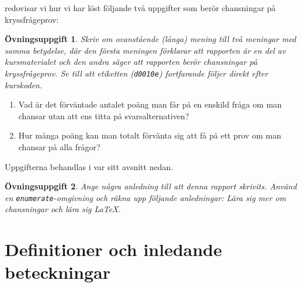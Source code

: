 \documentclass[12pt,a4wide]{article}
\theoremstyle{uppgiftsstil}
\newcommand{\ovningstext}{Övningsuppgift}
\newtheorem{ovning}{\ovningstext}
\newenvironment{uppgift}{\begin{framed}\begin{ovning}}%
                        {\end{ovning}\end{framed}}
\theoremstyle{avklaradstil}
\begin{document}
redovisar vi hur vi har löst följande två uppgifter som berör
chansningar på kryssfrågeprov:
\begin{uppgift}
  Skriv om ovanstående (långa) mening till två meningar med samma
  betydelse, där den första meningen förklarar att rapporten är en del
  av kursmaterialet och den andra säger att rapporten berör
  chansningar på kryssfrågeprov.  Se till att etiketten
  (\texttt{d0010e}) fortfarande följer direkt efter kurskoden. 
\end{uppgift}
\begin{enumerate}            %
  \item Vad är det förväntade antalet poäng man får på en enskild
    fråga om man chansar utan att ens titta på
    svarsalternativen? \label{item:question}  %
  \item Hur många poäng kan man totalt förvänta sig att få på ett prov
    om man chansar på alla frågor? \label{item:test} %
\end{enumerate}              %
Uppgifterna behandlas i var sitt avsnitt nedan. 
\begin{uppgift}
  Ange några anledning till att denna rapport skrivits. Använd en
  \texttt{enumerate}-omgivning och räkna upp följande anledningar:
  Lära sig mer om chansningar och lära sig \LaTeX.  
\end{uppgift}

\section{Definitioner och inledande beteckningar} 
\end{document}

